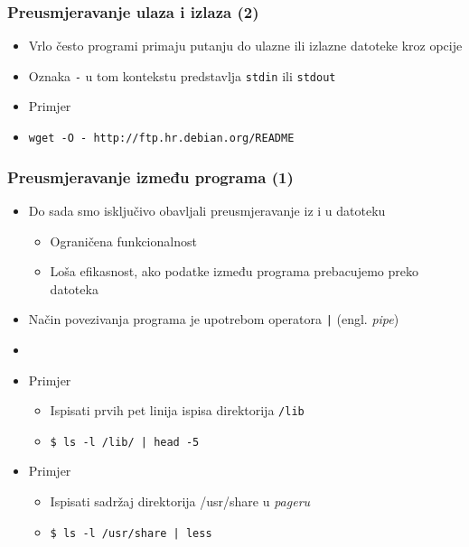 \documentclass{beamer}
\newcommand{\shell}[1]{\texttt{#1}}
\begin{document}
\begin{frame}[t]
	\frametitle{Preusmjeravanje ulaza i izlaza (2)}
	\begin{itemize}
		\item Vrlo često programi primaju putanju do ulazne ili izlazne datoteke kroz opcije
		\item Oznaka \shell{-} u tom kontekstu predstavlja \shell{stdin} ili \shell{stdout}
	\end{itemize}
	\begin{itemize}
		\item Primjer
		\item[] \shell{wget -O - http://ftp.hr.debian.org/README}
	\end{itemize}
\end{frame}

\begin{frame}[t]
\frametitle{Preusmjeravanje između programa (1)}
\begin{itemize}
  \item Do sada smo isključivo obavljali preusmjeravanje iz i u datoteku
  \begin{itemize}
    \item Ograničena funkcionalnost
    \item Loša efikasnost, ako podatke između programa prebacujemo preko
          datoteka
  \end{itemize}
  \item Način povezivanja programa je upotrebom operatora \shell{|} (engl.
        \emph{pipe})
  \item[]
  \item Primjer
  \begin{itemize}
  	\item Ispisati prvih pet linija ispisa direktorija \shell{/lib}
    \item[] \shell{\$ ls -l /lib/ | head -5}
  \end{itemize}
  \item Primjer
  \begin{itemize}
  	\item Ispisati sadržaj direktorija /usr/share u \textit{pageru}
  	\item[] \shell{\$ ls -l /usr/share | less}
  \end{itemize}
\end{itemize}
\end{frame}
\end{document}
